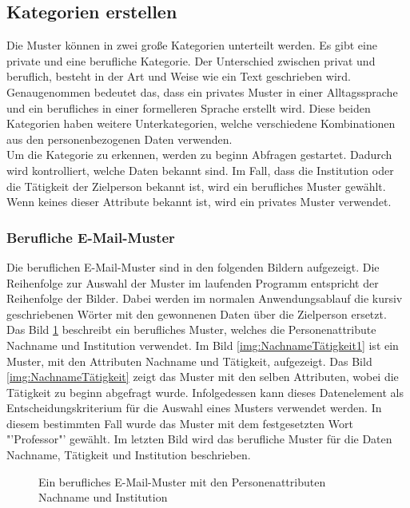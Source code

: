 	\subsection{Kategorien erstellen}
	Die Muster können in zwei große Kategorien unterteilt werden. Es gibt eine private und eine berufliche Kategorie. Der Unterschied zwischen privat und beruflich, besteht in der Art und Weise wie ein Text geschrieben wird. Genaugenommen bedeutet das, dass ein privates Muster in einer Alltagssprache und ein berufliches in einer formelleren Sprache erstellt wird. Diese beiden Kategorien haben weitere Unterkategorien, welche verschiedene Kombinationen aus den personenbezogenen Daten verwenden.\\
	Um die Kategorie zu erkennen, werden zu beginn Abfragen gestartet. Dadurch wird kontrolliert, welche Daten bekannt sind. Im Fall, dass die Institution oder die Tätigkeit der Zielperson bekannt ist, wird ein berufliches Muster gewählt. Wenn keines dieser Attribute bekannt ist, wird ein privates Muster verwendet.
	
		\subsubsection{Berufliche E-Mail-Muster}
		\label{subsubsec:beruflicheMuster}
		Die beruflichen E-Mail-Muster sind in den folgenden Bildern aufgezeigt. Die Reihenfolge zur Auswahl der Muster im laufenden Programm entspricht der Reihenfolge der Bilder. Dabei werden im normalen Anwendungsablauf die kursiv geschriebenen Wörter mit den gewonnenen Daten über die Zielperson ersetzt.\\ 
		Das Bild \ref{img:NameInstitution} beschreibt ein berufliches Muster, welches die Personenattribute Nachname und Institution verwendet. Im Bild \ref{img:NachnameTätigkeit1} ist ein Muster, mit den Attributen Nachname und Tätigkeit, aufgezeigt. Das Bild \ref{img:NachnameTätigkeit} zeigt das Muster mit den selben Attributen, wobei die Tätigkeit zu beginn abgefragt wurde. Infolgedessen kann dieses Datenelement als Entscheidungskriterium für die Auswahl eines Musters verwendet werden. In diesem bestimmten Fall wurde das Muster mit dem festgesetzten Wort "'Professor"' gewählt. Im letzten Bild wird das berufliche Muster für die Daten Nachname, Tätigkeit und Institution beschrieben.
			\begin{figure}[h!]
				\label{img:NameInstitution}
				\caption{Ein berufliches E-Mail-Muster mit den Personenattributen Nachname und Institution }
			\end{figure}
		
